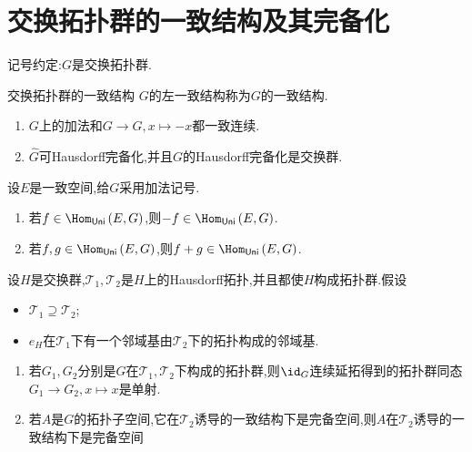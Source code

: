 \section{交换拓扑群的一致结构及其完备化}

记号约定:$G$是交换拓扑群.

\begin{definition}{交换拓扑群的一致结构}{}
	$G$的左一致结构称为$G$的一致结构.
\end{definition}

\begin{theorem}{}{}
	\begin{enumerate}
		\item $G$上的加法和$G\to G,x\mapsto -x$都一致连续.
		\item $\hat{G}$可Hausdorff完备化,并且$G$的Hausdorff完备化是交换群.
	\end{enumerate}
\end{theorem}

\begin{corollary}{}{}
	设$E$是一致空间,给$G$采用加法记号.
	\begin{enumerate}
		\item 若$f\in\Hom_{\mathsf{Uni}}\left(E,G\right)$,则$-f\in\Hom_{\mathsf{Uni}}\left(E,G\right)$.
		\item 若$f,g\in\Hom_{\mathsf{Uni}}\left(E,G\right)$,则$f+g\in\Hom_{\mathsf{Uni}}\left(E,G\right)$.
	\end{enumerate}
\end{corollary}

\begin{proposition}{}{}
	设$H$是交换群,$\mathcal{T}_{1},\mathcal{T}_{2}$是$H$上的Hausdorff拓扑,并且都使$H$构成拓扑群.假设
	\begin{itemize}
		\item $\mathcal{T}_{1}\supseteq\mathcal{T}_{2}$;
		\item $e_{H}$在$\mathcal{T}_{1}$下有一个邻域基由$\mathcal{T}_{2}$下的拓扑构成的邻域基.
	\end{itemize}
	\begin{enumerate}
		\item 若$G_{1},G_{2}$分别是$G$在$\mathcal{T}_{1},\mathcal{T}_{2}$下构成的拓扑群,则$\id_{G}$连续延拓得到的拓扑群同态$G_{1}\to G_{2},x\mapsto x$是单射.
		\item 若$A$是$G$的拓扑子空间,它在$\mathcal{T}_{2}$诱导的一致结构下是完备空间,则$A$在$\mathcal{T}_{2}$诱导的一致结构下是完备空间
	\end{enumerate}
\end{proposition}